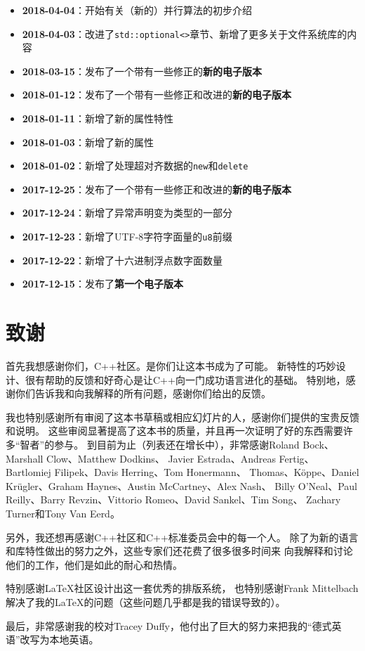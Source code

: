 \begin{itemize}
    \item \textbf{2018-04-04}：开始有关（新的）并行算法的初步介绍
    \item \textbf{2018-04-03}：改进了\texttt{std::optional<>}章节、新增了更多关于文件系统库的内容
    \item \textbf{2018-03-15}：发布了一个带有一些修正的\textbf{新的电子版本}
    \item \textbf{2018-01-12}：发布了一个带有一些修正和改进的\textbf{新的电子版本}
    \item \textbf{2018-01-11}：新增了新的属性特性
    \item \textbf{2018-01-03}：新增了新的属性
    \item \textbf{2018-01-02}：新增了处理超对齐数据的\texttt{new}和\texttt{delete}
    \item \textbf{2017-12-25}：发布了一个带有一些修正和改进的\textbf{新的电子版本}
    \item \textbf{2017-12-24}：新增了异常声明变为类型的一部分
    \item \textbf{2017-12-23}：新增了UTF-8字符字面量的\texttt{u8}前缀
    \item \textbf{2017-12-22}：新增了十六进制浮点数字面数量
    \item \textbf{2017-12-15}：发布了\textbf{第一个电子版本}
\end{itemize}


\section{致谢}
首先我想感谢你们，C++社区。是你们让这本书成为了可能。
新特性的巧妙设计、很有帮助的反馈和好奇心是让C++向一门成功语言进化的基础。
特别地，感谢你们告诉我和向我解释的所有问题，感谢你们给出的反馈。

我也特别感谢所有审阅了这本书草稿或相应幻灯片的人，感谢你们提供的宝贵反馈和说明。
这些审阅显著提高了这本书的质量，并且再一次证明了好的东西需要许多“智者”的参与。
到目前为止（列表还在增长中），非常感谢Roland Bock、Marshall Clow、Matthew Dodkins、
Javier Estrada、Andreas Fertig、Bartlomiej Filipek、Davis Herring、Tom Honermann、
Thomas、Köppe、Daniel Krügler、Graham Haynes、Austin McCartney、Alex Nash、
Billy O’Neal、Paul Reilly、Barry Revzin、Vittorio Romeo、David Sankel、Tim Song、
Zachary Turner和Tony Van Eerd。

另外，我还想再感谢C++社区和C++标准委员会中的每一个人。
除了为新的语言和库特性做出的努力之外，这些专家们还花费了很多很多时间来
向我解释和讨论他们的工作，他们是如此的耐心和热情。

特别感谢\LaTeX 社区设计出这一套优秀的排版系统，
也特别感谢Frank Mittelbach解决了我的\LaTeX 的问题（这些问题几乎都是我的错误导致的）。

最后，非常感谢我的校对Tracey Duffy，他付出了巨大的努力来把我的“德式英语”改写为本地英语。